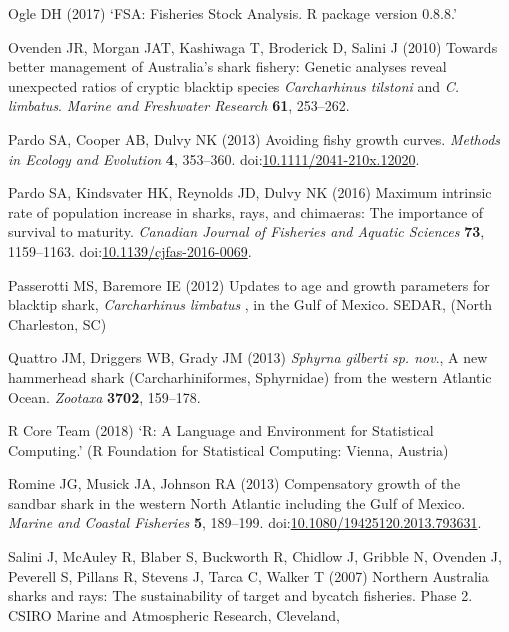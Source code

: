 \documentclass[]{article}
\begin{document}
\leavevmode\hypertarget{ref-ogle_fsa:_2017}{}%
Ogle DH (2017) `FSA: Fisheries Stock Analysis. R package version 0.8.8.'

\leavevmode\hypertarget{ref-ovenden_towards_2010}{}%
Ovenden JR, Morgan JAT, Kashiwaga T, Broderick D, Salini J (2010)
Towards better management of Australia's shark fishery: Genetic analyses
reveal unexpected ratios of cryptic blacktip species \emph{Carcharhinus
tilstoni} and \emph{C. limbatus}. \emph{Marine and Freshwater Research}
\textbf{61}, 253--262.

\leavevmode\hypertarget{ref-pardo_avoiding_2013}{}%
Pardo SA, Cooper AB, Dulvy NK (2013) Avoiding fishy growth curves.
\emph{Methods in Ecology and Evolution} \textbf{4}, 353--360.
doi:\href{https://doi.org/10.1111/2041-210x.12020}{10.1111/2041-210x.12020}.

\leavevmode\hypertarget{ref-pardo_maximum_2016}{}%
Pardo SA, Kindsvater HK, Reynolds JD, Dulvy NK (2016) Maximum intrinsic
rate of population increase in sharks, rays, and chimaeras: The
importance of survival to maturity. \emph{Canadian Journal of Fisheries
and Aquatic Sciences} \textbf{73}, 1159--1163.
doi:\href{https://doi.org/10.1139/cjfas-2016-0069}{10.1139/cjfas-2016-0069}.

\leavevmode\hypertarget{ref-passerotti_updates_2012}{}%
Passerotti MS, Baremore IE (2012) Updates to age and growth parameters
for blacktip shark, \emph{Carcharhinus limbatus} , in the Gulf of
Mexico. SEDAR, (North Charleston, SC)

\leavevmode\hypertarget{ref-quattro_sphyrna_2013}{}%
Quattro JM, Driggers WB, Grady JM (2013) \emph{Sphyrna gilberti sp.
nov}., A new hammerhead shark (Carcharhiniformes, Sphyrnidae) from the
western Atlantic Ocean. \emph{Zootaxa} \textbf{3702}, 159--178.

\leavevmode\hypertarget{ref-rcoreteam_r:_2018}{}%
R Core Team (2018) `R: A Language and Environment for Statistical
Computing.' (R Foundation for Statistical Computing: Vienna, Austria)

\leavevmode\hypertarget{ref-romine_compensatory_2013}{}%
Romine JG, Musick JA, Johnson RA (2013) Compensatory growth of the
sandbar shark in the western North Atlantic including the Gulf of
Mexico. \emph{Marine and Coastal Fisheries} \textbf{5}, 189--199.
doi:\href{https://doi.org/10.1080/19425120.2013.793631}{10.1080/19425120.2013.793631}.

\leavevmode\hypertarget{ref-salini_northern_2007}{}%
Salini J, McAuley R, Blaber S, Buckworth R, Chidlow J, Gribble N,
Ovenden J, Peverell S, Pillans R, Stevens J, Tarca C, Walker T (2007)
Northern Australia sharks and rays: The sustainability of target and
bycatch fisheries. Phase 2. CSIRO Marine and Atmospheric Research,
Cleveland,
\end{document}
